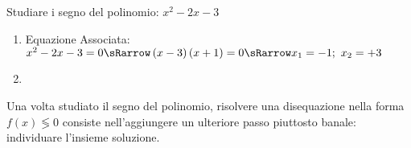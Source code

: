 \begin{esempio}
Studiare i segno del polinomio: \(x^2-2x-3\)

\begin{enumerate}
\item
Equazione Associata:~~
\(x^2-2x-3=0 \sRarrow 
  \left(x-3 \right)\left(x+1\right)=0 \sRarrow 
  x_1=-1;~x_2=+3\)
\item 
{}
                  {}
\end{enumerate}

\end{esempio}

Una volta studiato il segno del polinomio, risolvere una disequazione nella 
forma \(f(x) \lessgtr 0\) consiste nell'aggiungere un ulteriore passo 
piuttosto banale: individuare l'insieme soluzione.

\newpage %

